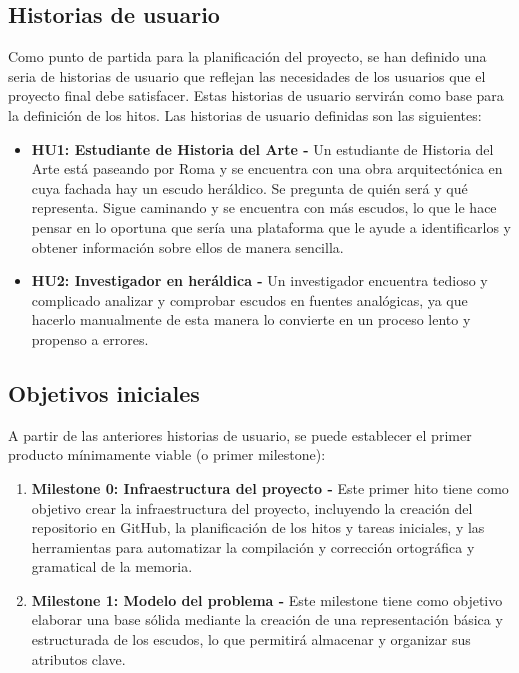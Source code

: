 \subsection{Historias de usuario}
Como punto de partida para la planificación del proyecto, se han definido una seria de 
historias de usuario que reflejan las necesidades de los usuarios que el proyecto final
debe satisfacer. Estas historias de usuario servirán como base para la definición de los hitos.
Las historias de usuario definidas son las siguientes:
\begin{itemize}
    \item \textbf{HU1: Estudiante de Historia del Arte - }Un estudiante de Historia del 
    Arte está paseando por Roma y se encuentra con una obra arquitectónica en cuya fachada
    hay un escudo heráldico. Se pregunta de quién será y qué representa. Sigue caminando 
    y se encuentra con más escudos, lo que le hace pensar en lo oportuna que sería una 
    plataforma que le ayude a identificarlos y obtener información sobre ellos de manera 
    sencilla.
    \item \textbf{HU2: Investigador en heráldica - }Un investigador encuentra tedioso y
    complicado analizar y comprobar escudos en fuentes analógicas, ya que hacerlo manualmente
    de esta manera lo convierte en un proceso lento y propenso a errores.
\end{itemize}

\subsection{Objetivos iniciales}
A partir de las anteriores historias de usuario, se puede establecer el primer
producto mínimamente viable (o primer milestone):
\begin{enumerate}
    \item \textbf{Milestone 0: Infraestructura del proyecto - }Este primer hito tiene como 
    objetivo crear la infraestructura del proyecto, incluyendo la creación del repositorio
    en GitHub, la planificación de los hitos y tareas iniciales, y las herramientas para automatizar
    la compilación y corrección ortográfica y gramatical de la memoria.
    \item \textbf{Milestone 1: Modelo del problema - }Este milestone tiene como objetivo
    elaborar una base sólida mediante la creación de una representación básica y estructurada
    de los escudos, lo que permitirá almacenar y organizar sus atributos clave.
\end{enumerate}

